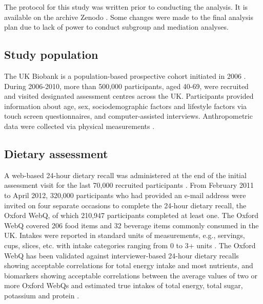 \documentclass[nutrients,article,submit,moreauthors,pdftex]{Definitions/mdpi}
\begin{document}
\noindent The protocol for this study was written prior to conducting
the analysis. It is available on the archive Zenodo \citep{protocol}. Some
changes were made to the final analysis plan due to lack of power to
conduct subgroup and mediation analyses.

\hypertarget{subsec1}{%
\subsection{Study population}\label{subsec1}}

The UK Biobank is a population-based prospective cohort initiated in
2006 \citep{sudlow2015}. During 2006-2010, more than 500,000 participants,
aged 40-69, were recruited and visited designated assessment centres
across the UK. Participants provided information about age, sex,
sociodemographic factors and lifestyle factors via touch screen
questionnaires, and computer-assisted interviews. Anthropometric data
were collected via physical measurements \citep{RN113}.

\hypertarget{subsec2}{%
\subsection{Dietary assessment}\label{subsec2}}

A web-based 24-hour dietary recall was administered at the end of the
initial assessment visit for the last 70,000 recruited participants
\citep{RN115}. From February 2011 to April 2012, 320,000 participants who had
provided an e-mail address were invited on four separate occasions to
complete the 24-hour dietary recall, the Oxford WebQ, of which 210,947
participants completed at least one. The Oxford WebQ covered 206 food
items and 32 beverage items commonly consumed in the UK. Intakes were
reported in standard units of measurements, e.g., servings, cups,
slices, etc. with intake categories ranging from 0 to 3+ units
\citep{piernas2021}. The Oxford WebQ has been validated against
interviewer-based 24-hour dietary recalls showing acceptable
correlations for total energy intake and most nutrients, and biomarkers
showing acceptable correlations between the average values of two or
more Oxford WebQs and estimated true intakes of total energy, total
sugar, potassium and protein \citep{Liu2011, Greenwood2019}.
\end{document}
